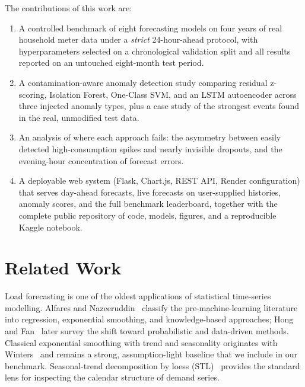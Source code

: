 \documentclass[10pt,a4paper]{article}
\begin{document}
The contributions of this work are:
\begin{enumerate}[leftmargin=1.6em,itemsep=1pt,topsep=2pt]
\item A controlled benchmark of eight forecasting models on four years of real
      household meter data under a \emph{strict} 24-hour-ahead protocol, with
      hyperparameters selected on a chronological validation split and all results
      reported on an untouched eight-month test period.
\item A contamination-aware anomaly detection study comparing residual z-scoring,
      Isolation Forest, One-Class SVM, and an LSTM autoencoder across three injected
      anomaly types, plus a case study of the strongest events found in the real,
      unmodified test data.
\item An analysis of where each approach fails: the asymmetry between easily detected
      high-consumption spikes and nearly invisible dropouts, and the evening-hour
      concentration of forecast errors.
\item A deployable web system (Flask, Chart.js, REST API, Render configuration) that
      serves day-ahead forecasts, live forecasts on user-supplied histories, anomaly
      scores, and the full benchmark leaderboard, together with the complete public
      repository of code, models, figures, and a reproducible Kaggle notebook.
\end{enumerate}

\section{Related Work}\label{sec:related}

Load forecasting is one of the oldest applications of statistical time-series
modelling. Alfares and Nazeeruddin~\cite{alfares2002electric} classify the
pre-machine-learning literature into regression, exponential smoothing, and
knowledge-based approaches; Hong and Fan~\cite{hong2016probabilistic} later survey the
shift toward probabilistic and data-driven methods. Classical exponential smoothing
with trend and seasonality originates with Winters~\cite{winters1960forecasting} and
remains a strong, assumption-light baseline that we include in our benchmark.
Seasonal-trend decomposition by loess (STL)~\cite{cleveland1990stl} provides the
standard lens for inspecting the calendar structure of demand series.
\end{document}
